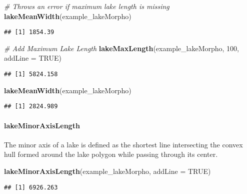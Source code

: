 \documentclass[11pt,]{article}
\newenvironment{Shaded}{\begin{snugshade}}{\end{snugshade}}
\newcommand{\KeywordTok}[1]{\textcolor[rgb]{0.13,0.29,0.53}{\textbf{{#1}}}}
\newcommand{\DataTypeTok}[1]{\textcolor[rgb]{0.13,0.29,0.53}{{#1}}}
\newcommand{\DecValTok}[1]{\textcolor[rgb]{0.00,0.00,0.81}{{#1}}}
\newcommand{\CommentTok}[1]{\textcolor[rgb]{0.56,0.35,0.01}{\textit{{#1}}}}
\newcommand{\OtherTok}[1]{\textcolor[rgb]{0.56,0.35,0.01}{{#1}}}
\newcommand{\NormalTok}[1]{{#1}}
\begin{document}
\begin{Shaded}
\begin{Highlighting}[]
\CommentTok{# Throws an error if maximum lake length is missing}
\KeywordTok{lakeMeanWidth}\NormalTok{(example_lakeMorpho)}
\end{Highlighting}
\end{Shaded}

\begin{verbatim}
## [1] 1854.39
\end{verbatim}

\begin{Shaded}
\begin{Highlighting}[]
\CommentTok{# Add Maximum Lake Length}
\KeywordTok{lakeMaxLength}\NormalTok{(example_lakeMorpho, }\DecValTok{100}\NormalTok{, }\DataTypeTok{addLine =} \OtherTok{TRUE}\NormalTok{)}
\end{Highlighting}
\end{Shaded}

\begin{verbatim}
## [1] 5824.158
\end{verbatim}

\begin{Shaded}
\begin{Highlighting}[]
\KeywordTok{lakeMeanWidth}\NormalTok{(example_lakeMorpho)}
\end{Highlighting}
\end{Shaded}

\begin{verbatim}
## [1] 2824.989
\end{verbatim}

\paragraph{lakeMinorAxisLength}\label{lakeminoraxislength}

The minor axis of a lake is defined as the shortest line intersecting
the convex hull formed around the lake polygon while passing through its
center.

\begin{Shaded}
\begin{Highlighting}[]
\KeywordTok{lakeMinorAxisLength}\NormalTok{(example_lakeMorpho, }\DataTypeTok{addLine =} \OtherTok{TRUE}\NormalTok{)}
\end{Highlighting}
\end{Shaded}

\begin{verbatim}
## [1] 6926.263
\end{verbatim}
\end{document}
